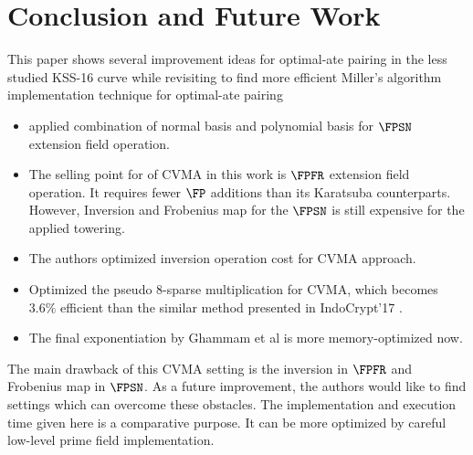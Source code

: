 \section{Conclusion and Future Work}\label{sec:5}
This paper shows several improvement ideas for optimal-ate pairing in the less studied KSS-16 curve while revisiting \cite{self_indo17} to find more efficient Miller's algorithm implementation technique for optimal-ate pairing
\begin{itemize}
	\item applied combination of normal basis  and polynomial basis for $\FPSN$ extension field operation.
\item	The selling point for of CVMA in this work is $\FPFR$ extension field operation. 
	It requires fewer $\FP$ additions than its Karatsuba counterparts. 
	However, Inversion and Frobenius map for the $\FPSN$ is still expensive for the applied towering.
	\item The authors optimized inversion operation cost for CVMA approach.
	\item  Optimized the pseudo 8-sparse multiplication for CVMA, which becomes $3.6\%$ efficient than the similar method presented in IndoCrypt'17 \cite{self_indo17}.
	\item  The final exponentiation by Ghammam et al \cite{loubna_kss16} is more memory-optimized now. 
\end{itemize}
The main drawback of this CVMA setting is the inversion in $\FPFR$ and Frobenius map in $\FPSN$.
As a future improvement, the authors would like to find settings which can overcome these obstacles. 
The implementation and execution time given here is a comparative purpose. It can be more optimized by careful low-level prime field implementation.

